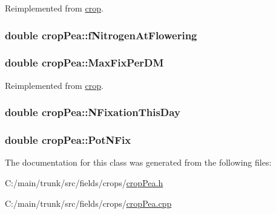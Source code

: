 Reimplemented from \hyperlink{classcrop_af06dc09d391a57692b440c7c492dbc41}{crop}.\hypertarget{classcrop_pea_a95d25dcf7dfa14e114de67a0029eab02}{
\subsubsection[{fNitrogenAtFlowering}]{\setlength{\rightskip}{0pt plus 5cm}double {\bf cropPea::fNitrogenAtFlowering}}}
\label{classcrop_pea_a95d25dcf7dfa14e114de67a0029eab02}
\hypertarget{classcrop_pea_a1852a7eb6965220c3bbd686504a87193}{
\subsubsection[{MaxFixPerDM}]{\setlength{\rightskip}{0pt plus 5cm}double {\bf cropPea::MaxFixPerDM}}}
\label{classcrop_pea_a1852a7eb6965220c3bbd686504a87193}


Reimplemented from \hyperlink{classcrop_acd7a9182db99895de016c87785b58cc9}{crop}.\hypertarget{classcrop_pea_a0b2798f6476655b22c242207b3fb0d0f}{
\subsubsection[{NFixationThisDay}]{\setlength{\rightskip}{0pt plus 5cm}double {\bf cropPea::NFixationThisDay}}}
\label{classcrop_pea_a0b2798f6476655b22c242207b3fb0d0f}
\hypertarget{classcrop_pea_ad48e8faf29f08617f2206c2577af11ac}{
\subsubsection[{PotNFix}]{\setlength{\rightskip}{0pt plus 5cm}double {\bf cropPea::PotNFix}}}
\label{classcrop_pea_ad48e8faf29f08617f2206c2577af11ac}


The documentation for this class was generated from the following files:\begin{DoxyCompactItemize}
\item 
C:/main/trunk/src/fields/crops/\hyperlink{crop_pea_8h}{cropPea.h}\item 
C:/main/trunk/src/fields/crops/\hyperlink{crop_pea_8cpp}{cropPea.cpp}\end{DoxyCompactItemize}
